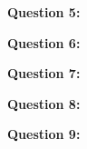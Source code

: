 \documentclass{report}
\begin{document}
    \bigbreak \noindent \bigbreak \noindent 
    \begin{Large}
        \textbf{Question 5:}
    \end{Large}
    \bigbreak \noindent 
    \bigbreak \noindent 

    \bigbreak \noindent \bigbreak \noindent 
    \begin{Large}
        \textbf{Question 6:}
    \end{Large}
    \bigbreak \noindent 
    \bigbreak \noindent 

    \bigbreak \noindent \bigbreak \noindent 
    \begin{Large}
        \textbf{Question 7:}
    \end{Large}
    \bigbreak \noindent 
    \bigbreak \noindent 

    \bigbreak \noindent \bigbreak \noindent 
    \begin{Large}
        \textbf{Question 8:}
    \end{Large}
    \bigbreak \noindent 
    \bigbreak \noindent 

    \bigbreak \noindent \bigbreak \noindent 
    \begin{Large}
        \textbf{Question 9:}
    \end{Large}
    \bigbreak \noindent 
    \bigbreak \noindent 
    
\end{document}
